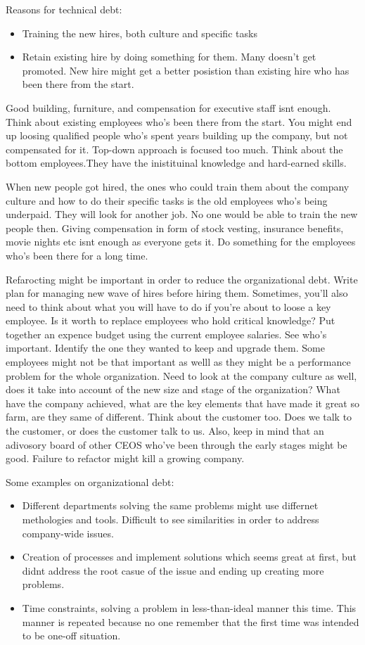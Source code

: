 Reasons for technical debt:

\begin{itemize}
	\item Training the new hires, both culture and specific tasks
	\item Retain existing hire by doing something for them. Many doesn't get promoted. New hire might get a better posistion than existing hire who has been there from the start.
\end{itemize}

Good building, furniture, and compensation for executive staff isnt enough. Think about existing employees who's been there from the start. You might end up loosing qualified people who's spent years building up the company, but not compensated for it. Top-down approach is focused too much. Think about the bottom employees.They have the inistituinal knowledge and hard-earned skills.

When new people got hired, the ones who could train them about the company culture and how to do their specific tasks is the old employees who's being underpaid. They will look for another job. No one would be able to train the new people then. Giving compensation in form of stock vesting, insurance benefits, movie nights etc isnt enough as everyone gets it. Do something for the employees who's been there for a long time.

Refarocting might be important in order to reduce the organizational debt. Write plan for managing new wave of hires before hiring them. Sometimes, you'll also need to think about what you will have to do if you're about to loose a key employee. Is it worth to replace employees who hold critical knowledge? Put together an expence budget using the current employee salaries. See who's important. Identify the one they wanted to keep and upgrade them. Some employees might not be that important as welll as they might be a performance problem for the whole organization. Need to look at the company culture as well, does it take into account of the new size and stage of the organization? What have the company achieved, what are the key elements that have made it great so farm, are they same of different. Think about the customer too. Does we talk to the customer, or does the customer talk to us. Also, keep in mind that an adivosory board of other CEOS who've been through the early stages might be good. Failure to refactor might kill a growing company\cite{steveblank}.

Some examples on organizational debt:
\begin{itemize}
	\item Different departments solving the same problems might use differnet methologies and tools. Difficult to see similarities in order to address company-wide issues.
	\item Creation of processes and implement solutions which seems great at first, but didnt address the root casue of the issue and ending up creating more problems.
	\item Time constraints, solving a problem in less-than-ideal manner this time. This manner is repeated because no one remember that the first time was intended to be one-off situation.
\end{itemize}


